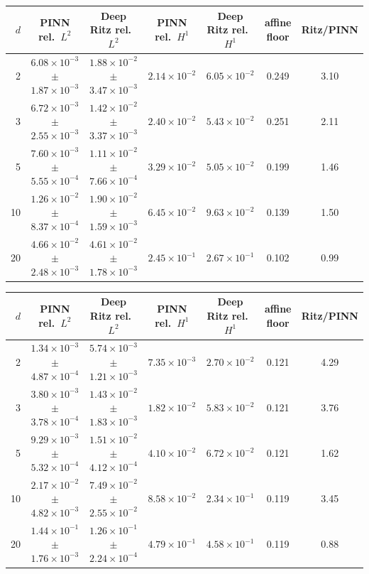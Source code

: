 \begin{tabular}{rcccccc}
\toprule
$d$ & PINN rel.\ $L^2$ & Deep Ritz rel.\ $L^2$ & PINN rel.\ $H^1$ & Deep Ritz rel.\ $H^1$ & affine floor & Ritz/PINN\\
\midrule
2 & $6.08\times10^{-3}$ $\pm$ $1.87\times10^{-3}$ & $1.88\times10^{-2}$ $\pm$ $3.47\times10^{-3}$ & $2.14\times10^{-2}$ & $6.05\times10^{-2}$ & 0.249 & 3.10\\
3 & $6.72\times10^{-3}$ $\pm$ $2.55\times10^{-3}$ & $1.42\times10^{-2}$ $\pm$ $3.37\times10^{-3}$ & $2.40\times10^{-2}$ & $5.43\times10^{-2}$ & 0.251 & 2.11\\
5 & $7.60\times10^{-3}$ $\pm$ $5.55\times10^{-4}$ & $1.11\times10^{-2}$ $\pm$ $7.66\times10^{-4}$ & $3.29\times10^{-2}$ & $5.05\times10^{-2}$ & 0.199 & 1.46\\
10 & $1.26\times10^{-2}$ $\pm$ $8.37\times10^{-4}$ & $1.90\times10^{-2}$ $\pm$ $1.59\times10^{-3}$ & $6.45\times10^{-2}$ & $9.63\times10^{-2}$ & 0.139 & 1.50\\
20 & $4.66\times10^{-2}$ $\pm$ $2.48\times10^{-3}$ & $4.61\times10^{-2}$ $\pm$ $1.78\times10^{-3}$ & $2.45\times10^{-1}$ & $2.67\times10^{-1}$ & 0.102 & 0.99\\
\bottomrule
\end{tabular}

\begin{tabular}{rcccccc}
\toprule
$d$ & PINN rel.\ $L^2$ & Deep Ritz rel.\ $L^2$ & PINN rel.\ $H^1$ & Deep Ritz rel.\ $H^1$ & affine floor & Ritz/PINN\\
\midrule
2 & $1.34\times10^{-3}$ $\pm$ $4.87\times10^{-4}$ & $5.74\times10^{-3}$ $\pm$ $1.21\times10^{-3}$ & $7.35\times10^{-3}$ & $2.70\times10^{-2}$ & 0.121 & 4.29\\
3 & $3.80\times10^{-3}$ $\pm$ $3.78\times10^{-4}$ & $1.43\times10^{-2}$ $\pm$ $1.83\times10^{-3}$ & $1.82\times10^{-2}$ & $5.83\times10^{-2}$ & 0.121 & 3.76\\
5 & $9.29\times10^{-3}$ $\pm$ $5.32\times10^{-4}$ & $1.51\times10^{-2}$ $\pm$ $4.12\times10^{-4}$ & $4.10\times10^{-2}$ & $6.72\times10^{-2}$ & 0.121 & 1.62\\
10 & $2.17\times10^{-2}$ $\pm$ $4.82\times10^{-3}$ & $7.49\times10^{-2}$ $\pm$ $2.55\times10^{-2}$ & $8.58\times10^{-2}$ & $2.34\times10^{-1}$ & 0.119 & 3.45\\
20 & $1.44\times10^{-1}$ $\pm$ $1.76\times10^{-3}$ & $1.26\times10^{-1}$ $\pm$ $2.24\times10^{-4}$ & $4.79\times10^{-1}$ & $4.58\times10^{-1}$ & 0.119 & 0.88\\
\bottomrule
\end{tabular}

